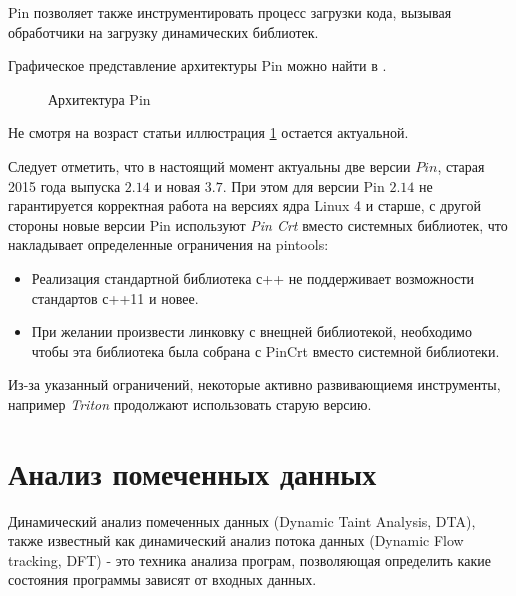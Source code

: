 Pin позволяет также инструментировать процесс загрузки кода, вызывая обработчики на загрузку динамических библиотек.

Графическое представление архитектуры Pin можно найти в \cite{PIN}.
\begin{figure}[H]
    \caption{Архитектура Pin}
    \label{fig:pin}
\end{figure}
Не смотря на возраст статьи иллюстрация \ref{fig:pin} остается актуальной.


Следует отметить, что в настоящий момент актуальны две версии $Pin$, старая 2015 года выпуска $2.14$ и новая $3.7$. При этом для версии Pin $2.14$ не гарантируется корректная работа на версиях ядра Linux 4 и старше, с другой стороны новые версии Pin используют \emph{Pin Crt} вместо системных библиотек, что накладывает определенные ограничения на pintools:

\begin{itemize}
    \item Реализация стандартной библиотека с++ не поддерживает возможности стандартов с++11 и новее.
    \item При желании произвести линковку с внещней библиотекой, необходимо чтобы эта библиотека была собрана с PinCrt вместо системной библиотеки.
\end{itemize}

Из-за указанный ограничений, некоторые активно развивающиемя инструменты, например \emph{Triton} продолжают использовать старую версию.

\section{Анализ помеченных данных}

Динамический анализ помеченных данных (Dynamic Taint Analysis, DTA), также известный как динамический анализ потока данных (Dynamic Flow tracking, DFT) - это техника анализа програм, позволяющая определить какие состояния программы зависят от входных данных.

